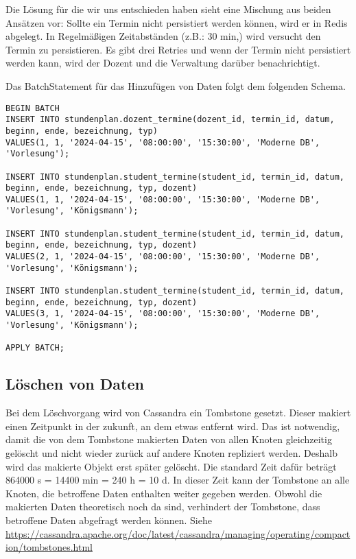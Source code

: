 Die Lösung für die wir uns entschieden haben sieht eine Mischung aus beiden Ansätzen vor: Sollte ein Termin nicht persistiert werden können, wird er in Redis abgelegt. In Regelmäßigen Zeitabständen (z.B.: 30 min,) wird versucht den Termin zu persistieren. Es gibt drei Retries und wenn der Termin nicht persistiert werden kann, wird der Dozent und die Verwaltung darüber benachrichtigt.

\newpage

Das BatchStatement für das Hinzufügen von Daten folgt dem folgenden Schema.
\begin{lstlisting}
BEGIN BATCH
INSERT INTO stundenplan.dozent_termine(dozent_id, termin_id, datum, beginn, ende, bezeichnung, typ) 
VALUES(1, 1, '2024-04-15', '08:00:00', '15:30:00', 'Moderne DB', 'Vorlesung');

INSERT INTO stundenplan.student_termine(student_id, termin_id, datum, beginn, ende, bezeichnung, typ, dozent) 
VALUES(1, 1, '2024-04-15', '08:00:00', '15:30:00', 'Moderne DB', 'Vorlesung', 'Königsmann');

INSERT INTO stundenplan.student_termine(student_id, termin_id, datum, beginn, ende, bezeichnung, typ, dozent) 
VALUES(2, 1, '2024-04-15', '08:00:00', '15:30:00', 'Moderne DB', 'Vorlesung', 'Königsmann');

INSERT INTO stundenplan.student_termine(student_id, termin_id, datum, beginn, ende, bezeichnung, typ, dozent) 
VALUES(3, 1, '2024-04-15', '08:00:00', '15:30:00', 'Moderne DB', 'Vorlesung', 'Königsmann');

APPLY BATCH;
\end{lstlisting}

\newpage

\subsection{Löschen von Daten}
Bei dem Löschvorgang wird von Cassandra ein Tombstone gesetzt. Dieser makiert einen Zeitpunkt in der zukunft, an dem etwas entfernt wird. Das ist notwendig, damit die von dem Tombstone makierten Daten von allen Knoten gleichzeitig gelöscht und nicht wieder zurück auf andere Knoten repliziert werden. Deshalb wird das makierte Objekt erst später gelöscht. Die standard Zeit dafür beträgt 864000 s = 14400 min = 240 h = 10 d. In dieser Zeit kann der Tombstone an alle Knoten, die betroffene Daten enthalten weiter gegeben werden. Obwohl die makierten Daten theoretisch noch da sind, verhindert der Tombstone, dass betroffene Daten abgefragt werden können. Siehe \href{https://cassandra.apache.org/doc/latest/cassandra/managing/operating/compaction/tombstones.html}{https://cassandra.apache.org/doc/latest/cassandra/managing/operating/compaction/tombstones.html}

